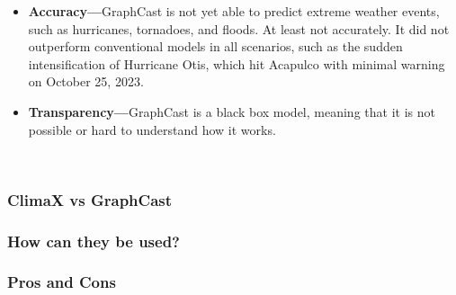 \documentclass[../paper.tex]{subfiles}
\begin{document}
        \begin{itemize}
            \item \textbf{Accuracy—}GraphCast is not yet able to predict extreme weather events, such as hurricanes, tornadoes, and floods.
            At least not accurately.
            It did not outperform conventional models in all scenarios, such as the sudden intensification of Hurricane Otis, which hit Acapulco with minimal warning on October 25, 2023\cite{e4}.
            \item \textbf{Transparency—}GraphCast is a black box model, meaning that it is not possible or hard to understand how it works.
        \end{itemize}
    \hfill\\
    \subsubsection{ClimaX vs GraphCast}

    \subsubsection{How can they be used?}

    \subsubsection{Pros and Cons}
\end{document}
